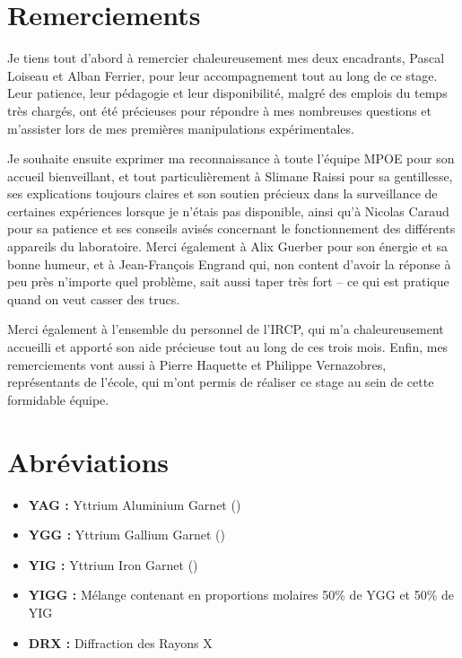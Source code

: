\documentclass{rapportENSCP}
\begin{document}

\section{Remerciements} 
Je tiens tout d’abord à remercier chaleureusement mes deux encadrants, Pascal Loiseau et Alban Ferrier, pour leur accompagnement tout au long de ce stage. Leur patience, leur pédagogie et leur disponibilité, malgré des emplois du temps très chargés, ont été précieuses pour répondre à mes nombreuses questions et m’assister lors de mes premières manipulations expérimentales.

Je souhaite ensuite exprimer ma reconnaissance à toute l’équipe MPOE pour son accueil bienveillant, et tout particulièrement à Slimane Raissi pour sa gentillesse, ses explications toujours claires et son soutien précieux dans la surveillance de certaines expériences lorsque je n’étais pas disponible, ainsi qu’à Nicolas Caraud pour sa patience et ses conseils avisés concernant le fonctionnement des différents appareils du laboratoire. Merci également à Alix Guerber pour son énergie et sa bonne humeur, et à Jean-François Engrand qui, non content d’avoir la réponse à peu près n’importe quel problème, sait aussi taper très fort – ce qui est pratique quand on veut casser des trucs.

Merci également à l’ensemble du personnel de l’IRCP, qui m’a chaleureusement accueilli et apporté son aide précieuse tout au long de ces trois mois. Enfin, mes remerciements vont aussi à Pierre Haquette et Philippe Vernazobres, représentants de l’école, qui m’ont permis de réaliser ce stage au sein de cette formidable équipe.

\newpage

\section{Abréviations}
\begin{itemize}
    \item \textbf{YAG : } Yttrium Aluminium Garnet (\YAG)
    \item \textbf{YGG : } Yttrium Gallium Garnet (\YIG)
    \item \textbf{YIG : } Yttrium Iron Garnet (\YGG)
    \item \textbf{YIGG : }Mélange contenant en proportions molaires 50\% de YGG et 50\% de YIG
    \item \textbf{DRX : }Diffraction des Rayons X
    
\end{itemize}
\end{document}
